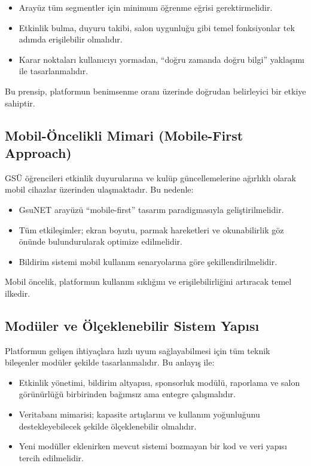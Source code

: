 \documentclass[a4paper,12pt]{report}
\begin{document}
\begin{itemize}
    \item Arayüz tüm segmentler için minimum öğrenme eğrisi gerektirmelidir.
    \item Etkinlik bulma, duyuru takibi, salon uygunluğu gibi temel fonksiyonlar tek adımda erişilebilir olmalıdır.
    \item Karar noktaları kullanıcıyı yormadan, “doğru zamanda doğru bilgi” yaklaşımı ile tasarlanmalıdır.
\end{itemize}

Bu prensip, platformun benimsenme oranı üzerinde doğrudan belirleyici bir etkiye sahiptir.

\subsection{Mobil-Öncelikli Mimari (Mobile-First Approach)}

GSÜ öğrencileri etkinlik duyurularına ve kulüp güncellemelerine ağırlıklı olarak mobil cihazlar üzerinden ulaşmaktadır. Bu nedenle:

\begin{itemize}
    \item GsuNET arayüzü “mobile-first” tasarım paradigmasıyla geliştirilmelidir.
    \item Tüm etkileşimler; ekran boyutu, parmak hareketleri ve okunabilirlik göz önünde bulundurularak optimize edilmelidir.
    \item Bildirim sistemi mobil kullanım senaryolarına göre şekillendirilmelidir.
\end{itemize}

Mobil öncelik, platformun kullanım sıklığını ve erişilebilirliğini artıracak temel ilkedir.

\subsection{Modüler ve Ölçeklenebilir Sistem Yapısı}

Platformun gelişen ihtiyaçlara hızlı uyum sağlayabilmesi için tüm teknik bileşenler modüler şekilde tasarlanmalıdır. Bu anlayış ile:

\begin{itemize}
    \item Etkinlik yönetimi, bildirim altyapısı, sponsorluk modülü, raporlama ve salon görünürlüğü birbirinden bağımsız ama entegre çalışmalıdır.
    \item Veritabanı mimarisi; kapasite artışlarını ve kullanım yoğunluğunu destekleyebilecek şekilde ölçeklenebilir olmalıdır.
    \item Yeni modüller eklenirken mevcut sistemi bozmayan bir kod ve veri yapısı tercih edilmelidir.
\end{itemize}
\end{document}
